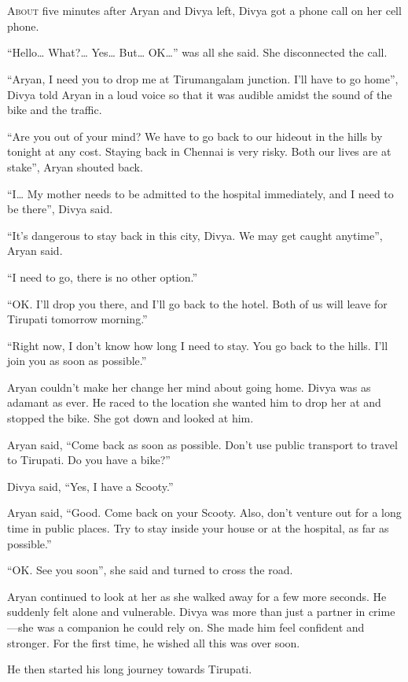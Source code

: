 \chapter{}

\lettrine{A}{bout} five minutes after Aryan and Divya left, Divya got a phone
call on her cell phone.

“Hello… What?… Yes… But… OK…” was all she said. She
disconnected the call.

“Aryan, I need you to drop me at Tirumangalam junction. I'll have to go home”,
Divya told Aryan in a loud voice so that it was audible amidst the sound of
the bike and the traffic.

“Are you out of your mind? We have to go back to our hideout in the hills by
tonight at any cost. Staying back in Chennai is very risky. Both our lives are
at stake”, Aryan shouted back.

“I… My mother needs to be admitted to the hospital immediately, and I need
to be there”, Divya said.

“It's dangerous to stay back in this city, Divya. We may get caught anytime”,
Aryan said.

“I need to go, there is no other option.”

“OK. I'll drop you there, and I'll go back to the hotel. Both of us will leave for
Tirupati tomorrow morning.”

“Right now, I don't know how long I need to stay. You go back to the hills. I'll
join you as soon as possible.”

Aryan couldn't make her change her mind about going home. Divya was as adamant as ever. He
raced to the location she wanted him to drop her at and stopped the bike. She got
down and looked at him.

Aryan said, “Come back as soon as possible. Don't use public transport to travel
to Tirupati. Do you have a bike?”

Divya said, “Yes, I have a Scooty.”

Aryan said, “Good. Come back on your Scooty. Also, don't venture out for a long
time in public places. Try to stay inside your house or at the hospital, as
far as possible.”

“OK. See you soon”, she said and turned to cross the road.

Aryan continued to look at her as she walked away for a few more seconds. He
suddenly felt alone and vulnerable. Divya was more than just a partner in
crime—she was a companion he could rely on. She made him feel confident and
stronger. For the first time, he wished all this was over soon.

He then started his long journey towards Tirupati.